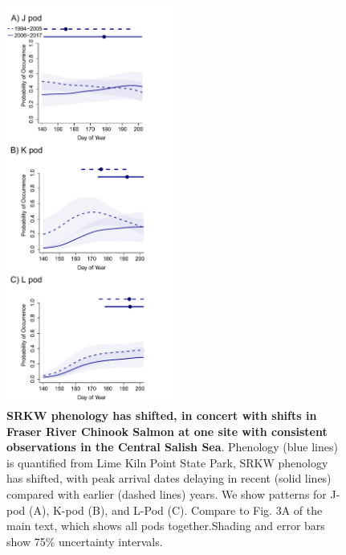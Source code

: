 \documentclass{article}
\begin{document}
\newpage
\begin{figure}[ht]
\includegraphics[width=0.5\textwidth]{../analyses/orcaphen/figures/orcachinphenoverlap_allpods2006.pdf}
\caption{\textbf{SRKW phenology has shifted, in concert with shifts in Fraser River Chinook Salmon at one site with consistent observations in the Central Salish Sea}. Phenology (blue lines) is quantified from Lime Kiln Point State Park, SRKW phenology has shifted, with peak arrival dates delaying in recent (solid lines) compared with earlier (dashed lines) years. We show patterns for J-pod (A), K-pod (B), and L-Pod (C). Compare to Fig. 3A of the main text, which shows all pods together.Shading and error bars show 75\% uncertainty intervals. }
\label{fig:KLchin}
\end{figure}
\end{document}
